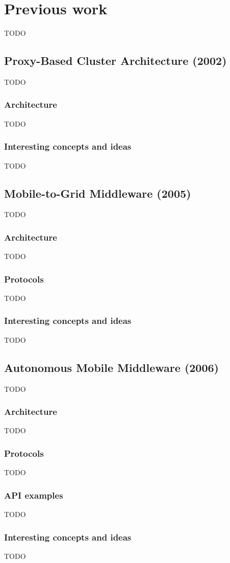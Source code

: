 \section{Previous work}
TODO

\subsection{Proxy-Based Cluster Architecture (2002)}
TODO

\subsubsection{Architecture}
TODO

\subsubsection{Interesting concepts and ideas}
TODO

\subsection{Mobile-to-Grid Middleware (2005)}
TODO

\subsubsection{Architecture}
TODO

\subsubsection{Protocols}
TODO

\subsubsection{Interesting concepts and ideas}
TODO

\subsection{Autonomous Mobile Middleware (2006)}
TODO

\subsubsection{Architecture}
TODO

\subsubsection{Protocols}
TODO

\subsubsection{API examples}
TODO

\subsubsection{Interesting concepts and ideas}
TODO